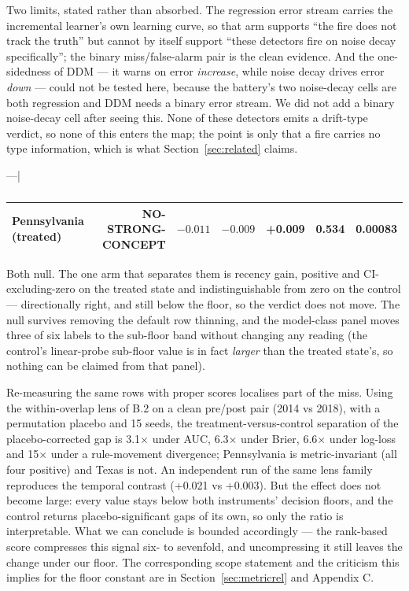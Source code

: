 \documentclass[10pt]{article} %
\begin{document}
Two limits, stated rather than absorbed. The regression error stream carries the incremental
learner's own learning curve, so that arm supports ``the fire does not track the truth'' but cannot
by itself support ``these detectors fire on noise decay specifically''; the binary miss/false-alarm
pair is the clean evidence. And the one-sidedness of DDM --- it warns on error \emph{increase}, while noise
decay drives error \emph{down} --- could not be tested here, because the battery's two noise-decay cells
are both regression and DDM needs a binary error stream. We did not add a binary noise-decay cell
after seeing this. None of these detectors emits a drift-type verdict, so none of this enters the
map; the point is only that a fire carries no type information, which is what Section~\ref{sec:related} claims.

---|
\begin{table}[t]
\centering
\small
\caption{}
\label{tab:unnamed38}
\begin{tabular}{@{}lrrrrrr@{}}
\toprule
Pennsylvania (treated) & NO-STRONG-CONCEPT & $-0.011$ & $-0.009$ & +0.009 & 0.534 & 0.00083 \\
\midrule
\bottomrule
\end{tabular}
\end{table}

Both null. The one arm that separates them is recency gain, positive and CI-excluding-zero on the
treated state and indistinguishable from zero on the control --- directionally right, and still
below the floor, so the verdict does not move. The null survives removing the default row
thinning, and the model-class panel moves three of six labels to the sub-floor band without
changing any reading (the control's linear-probe sub-floor value is in fact \emph{larger} than the
treated state's, so nothing can be claimed from that panel).

Re-measuring the same rows with proper scores localises part of the miss. Using the
within-overlap lens of B.2 on a clean pre/post pair (2014 vs 2018), with a permutation placebo and
15 seeds, the treatment-versus-control separation of the placebo-corrected gap is 3.1$\times$ under AUC,
6.3$\times$ under Brier, 6.6$\times$ under log-loss and 15$\times$ under a rule-movement divergence; Pennsylvania is
metric-invariant (all four positive) and Texas is not. An independent run of the same lens family
reproduces the temporal contrast (+0.021 vs +0.003). But the effect does not become large: every
value stays below both instruments' decision floors, and the control returns placebo-significant
gaps of its own, so only the ratio is interpretable. What we can conclude is bounded accordingly ---
the rank-based score compresses this signal six- to sevenfold, and uncompressing it still leaves
the change under our floor. The corresponding scope statement and the criticism this implies for
the floor constant are in Section~\ref{sec:metricrel} and Appendix C.
\end{document}
